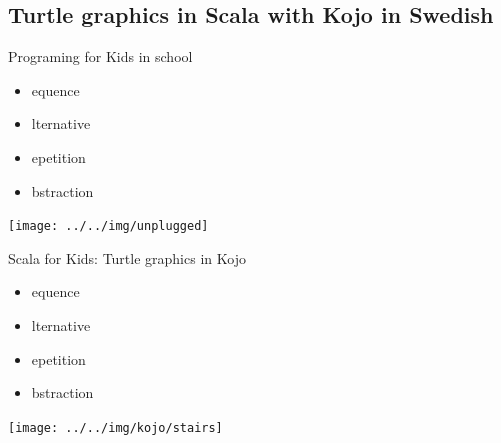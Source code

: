 \documentclass{lecturenotes}
\begin{document}
\subsection[Turtle graphics in Scala with Kojo]{Turtle graphics in Scala with Kojo in Swedish}

\begin{Slide}{Programing for Kids in school}
\begin{multicols}{3}
\begin{itemize}
\item {}equence
\item {}lternative
\item {}epetition
\item {}bstraction
\end{itemize}
\columnbreak
\texttt{[image: ../../img/unplugged]}
\end{multicols}
\end{Slide}


\begin{Slide}{Scala for Kids: Turtle graphics in Kojo}
\begin{multicols}{2}
\begin{itemize}
\item {}equence
\item {}lternative
\item {}epetition
\item {}bstraction
\end{itemize}
\columnbreak
{\texttt{[image: ../../img/kojo/stairs]}}
\end{multicols}
\end{Slide}
\end{document}
